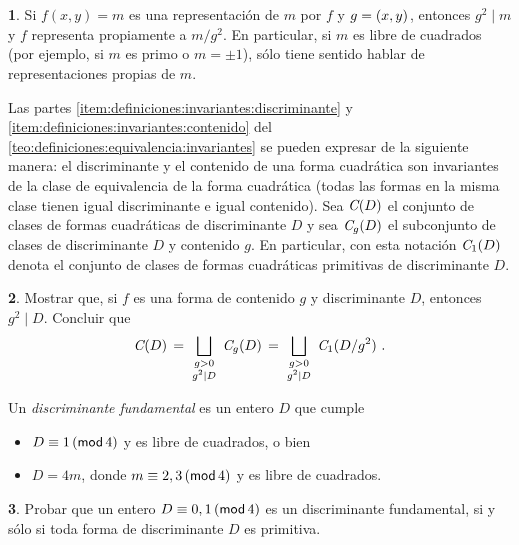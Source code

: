 \theoremstyle{definition}
\newtheorem{ejerDefiniciones}{\ejername}[section]


\begin{ejerDefiniciones}\label{ejer:definiciones:propiamente}
	Si $f(x,y)=m$ es una representaci\'on de $m$ por $f$ y
	$g=\mcd{x,y}$, entonces $g^2\mid m$ y $f$ representa
	propiamente a $m/g^2$.
	En particular, si $m$ es libre de cuadrados (por ejemplo,
	si $m$ es primo o $m=\pm 1$), s\'olo tiene sentido hablar
	de representaciones propias de $m$.
\end{ejerDefiniciones}

	Las partes \eqref{item:definiciones:invariantes:discriminante}
	y \eqref{item:definiciones:invariantes:contenido} del \teoname~%
	\ref{teo:definiciones:equivalencia:invariantes}
	se pueden expresar de la siguiente manera: el discriminante y
	el contenido de una forma cuadr\'atica son invariantes de la
	clase de equivalencia de la forma cuadr\'atica (todas las formas
	en la misma clase tienen igual discriminante e igual contenido).
	Sea $\Clases(D)$ el conjunto de clases de formas cuadr\'aticas de
	discriminante $D$ y sea $\Clases[g](D)$ el subconjunto de clases
	de discriminante $D$ y contenido $g$.
	En particular, con esta notaci\'on $\Clases[1](D)$ denota el
	conjunto de clases de formas cuadr\'aticas primitivas de
	discriminante $D$.

\begin{ejerDefiniciones}\label{ejer:definiciones:clases}
	Mostrar que, si $f$ es una forma de contenido $g$ y discriminante
	$D$, entonces $g^2\mid D$. Concluir que
	\begin{displaymath}
		\Clases(D)\,=\,
		\bigsqcup_{\smatrix{g>0 \\ g^2\mid D}}\,\Clases[g](D)
			\,=\,\bigsqcup_{\smatrix{g>0 \\ g^2\mid D}}\,
				\Clases[1](D/g^2)
		\text{ .}
	\end{displaymath}
\end{ejerDefiniciones}

	Un \emph{discriminante fundamental} es un entero $D$ que cumple
	\begin{itemize}
		\item $D\equiv 1\tmodulo[4]$ y es libre de cuadrados,
			o bien
		\item $D=4m$, donde $m\equiv 2,3\tmodulo[4]$ y es libre
			de cuadrados.
	\end{itemize}

\begin{ejerDefiniciones}\label{ejer:definiciones:fundamental}
	Probar que un entero $D\equiv 0,1\tmodulo[4]$ es un discriminante
	fundamental, si y s\'olo si toda forma de discriminante $D$ es
	primitiva.
\end{ejerDefiniciones}

